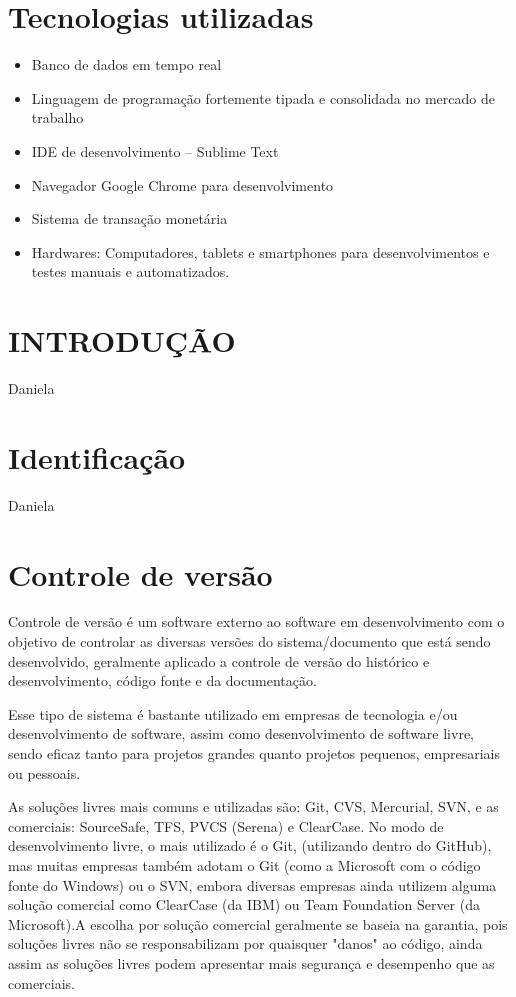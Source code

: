 \documentclass[12pt]{article}
\begin{document}
    \section{Tecnologias utilizadas}
        \begin{itemize}
            \item Banco de dados em tempo real
            \item Linguagem de programação fortemente tipada e consolidada no mercado de trabalho
            \item IDE de desenvolvimento – Sublime Text
            \item Navegador Google Chrome para desenvolvimento 
            \item Sistema de transação monetária
            \item Hardwares: Computadores, tablets e smartphones para desenvolvimentos e testes manuais e automatizados.
        \end{itemize}
        
    \section{INTRODUÇÃO}
        Daniela
    \section{Identificação}
        Daniela
    \section{Controle de versão}
        Controle de versão é um software externo ao software em desenvolvimento com o objetivo de controlar as diversas versões do sistema/documento que está sendo desenvolvido, geralmente aplicado a controle de versão do histórico e desenvolvimento, código fonte e da documentação.
        
        Esse tipo de sistema é bastante utilizado em empresas de tecnologia e/ou desenvolvimento de software, assim como desenvolvimento de software livre, sendo eficaz tanto para projetos grandes quanto projetos pequenos, empresariais ou pessoais.
        
        As soluções livres mais comuns e utilizadas são: Git, CVS, Mercurial, SVN, e as comerciais: SourceSafe, TFS, PVCS (Serena) e ClearCase. No modo de desenvolvimento livre, o mais utilizado é o Git, (utilizando dentro do GitHub), mas muitas empresas também adotam o Git (como a Microsoft com o código fonte do Windows) ou o SVN, embora diversas empresas ainda utilizem alguma solução comercial como ClearCase (da IBM) ou Team Foundation Server (da Microsoft).A escolha por solução comercial geralmente se baseia na garantia, pois soluções livres não se responsabilizam por quaisquer "danos" ao código, ainda assim as soluções livres podem apresentar mais segurança e desempenho que as comerciais. 
        
\end{document}
